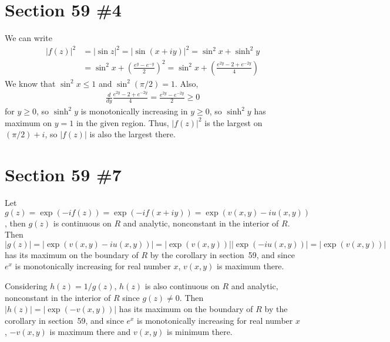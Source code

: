\documentclass{scrartcl}
\begin{document}
\section{Section 59 \#4}
We can write
\begin{align*}
  |f(z)|^2 &= |\sin z|^2 = |\sin (x + iy)|^2 = \sin^2 x + \sinh^2 y \\
           &= \sin^2 x + \left( \frac{e^y - e^{-y}}{2} \right)^2 = \sin^2 x + \left( \frac{e^{2y} - 2 + e^{-2y}}{4} \right)
\end{align*}
We know that \(\sin^2 x \leq 1\) and \(\sin^2 (\pi / 2) = 1\).
Also,
\begin{align*}
  \frac{d}{dy} \frac{e^{2y} - 2 + e^{-2y}}{4} = \frac{e^{2y} - e^{-2y}}{2} \geq 0
\end{align*}
for \(y \geq 0\), so \(\sinh^2 y\) is monotonically increasing in \(y \geq 0\), so \(\sinh^2 y\) has maximum on \(y = 1\) in the given region.
Thus, \(|f(z)|^2\) is the largest on \((\pi / 2) + i\), so \(|f(z)|\) is also the largest there.

\section{Section 59 \#7}
Let \(g(z) = \exp(-if(z)) = \exp(-if(x + iy)) = \exp(v(x, y) - iu(x, y))\), then \(g(z)\) is continuous on \(R\) and analytic, nonconstant in the interior of \(R\).
Then \(|g(z)| = |\exp(v(x, y) - iu(x, y))| = |\exp(v(x, y))| |\exp(-iu(x, y))| = |\exp(v(x, y))|\) has its maximum on the boundary of \(R\) by the corollary in section~59, and since \(e^x\) is monotonically increasing for real number \(x\), \(v(x, y)\) is maximum there.

Considering \(h(z) = 1 / g(z)\), \(h(z)\) is also continuous on \(R\) and analytic, nonconstant in the interior of \(R\) since \(g(z) \not = 0\).
Then \(|h(z)| = |\exp(-v(x, y))|\) has its maximum on the boundary of \(R\) by the corollary in section~59, and since \(e^x\) is monotonically increasing for real number \(x\), \(-v(x, y)\) is maximum there and \(v(x, y)\) is minimum there.
\end{document}
